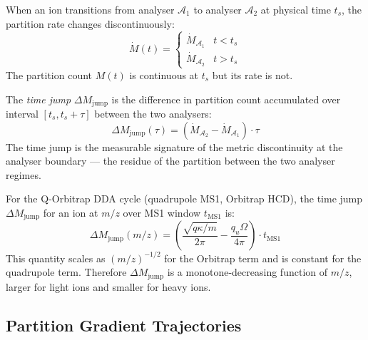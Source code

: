 \begin{definition}
\label{def:rate_discontinuity}
When an ion transitions from analyser $\mathcal{A}_1$ to analyser $\mathcal{A}_2$
at physical time $t_s$, the partition rate changes discontinuously:
\begin{equation}
    \dot{M}(t) = \begin{cases}
        \dot{M}_{\mathcal{A}_1} & t < t_s \\
        \dot{M}_{\mathcal{A}_2} & t > t_s
    \end{cases}
    \label{eq:rate_discontinuity}
\end{equation}
The partition count $M(t)$ is continuous at $t_s$ but its rate is not.
\end{definition}

\begin{definition}
\label{def:time_jump}
The \emph{time jump} $\Delta M_{\mathrm{jump}}$ is the difference in partition
count accumulated over interval $[t_s, t_s + \tau]$ between the two analysers:
\begin{equation}
    \Delta M_{\mathrm{jump}}(\tau) = \left(\dot{M}_{\mathcal{A}_2} -
    \dot{M}_{\mathcal{A}_1}\right) \cdot \tau
    \label{eq:time_jump}
\end{equation}
The time jump is the measurable signature of the metric discontinuity at the
analyser boundary --- the residue of the partition between the two analyser
regimes.
\end{definition}

\begin{theorem}
\label{thm:jump_scaling}
For the Q-Orbitrap DDA cycle (quadrupole MS1, Orbitrap HCD), the time jump
$\Delta M_{\mathrm{jump}}$ for an ion at $m/z$ over MS1 window $t_{\mathrm{MS1}}$
is:
\begin{equation}
    \Delta M_{\mathrm{jump}}(m/z) = \left(\frac{\sqrt{q\kappa/m}}{2\pi} -
    \frac{q_u\Omega}{4\pi}\right) \cdot t_{\mathrm{MS1}}
    \label{eq:jump_scaling}
\end{equation}
This quantity scales as $(m/z)^{-1/2}$ for the Orbitrap term and is constant
for the quadrupole term. Therefore $\Delta M_{\mathrm{jump}}$ is a
monotone-decreasing function of $m/z$, larger for light ions and smaller for
heavy ions.
\end{theorem}

\subsection{Partition Gradient Trajectories}
\label{subsec:gradient_traj}

